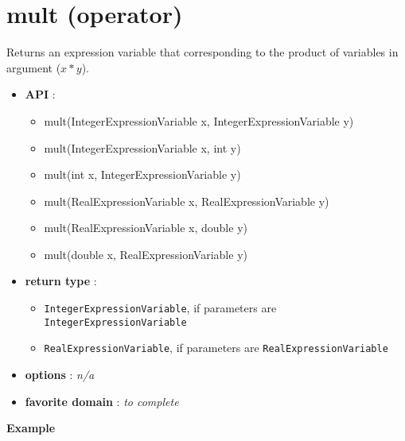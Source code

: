 \label{mult}
\hypertarget{mult}{}

\section{mult (operator)}\label{mult:multoperator}\hypertarget{mult:multoperator}{}
Returns an expression variable that corresponding to the product of variables in argument (\(x*y\)).

\begin{itemize}
	\item \textbf{API} :
	\begin{itemize}
		\item mult(IntegerExpressionVariable x, IntegerExpressionVariable y)
		\item mult(IntegerExpressionVariable x, int y)
		\item mult(int x, IntegerExpressionVariable y)
		\item mult(RealExpressionVariable x, RealExpressionVariable y)
		\item mult(RealExpressionVariable x, double y)
		\item mult(double x, RealExpressionVariable y)
	\end{itemize}
	\item \textbf{return type} :
	\begin{itemize}
		\item \texttt{IntegerExpressionVariable}, if parameters are \texttt{IntegerExpressionVariable}
		\item \texttt{RealExpressionVariable}, if parameters are \texttt{RealExpressionVariable}
	\end{itemize}
	\item \textbf{options} : \emph{n/a}
	\item \textbf{favorite domain} : \emph{to complete}
\end{itemize}

\textbf{Example}

